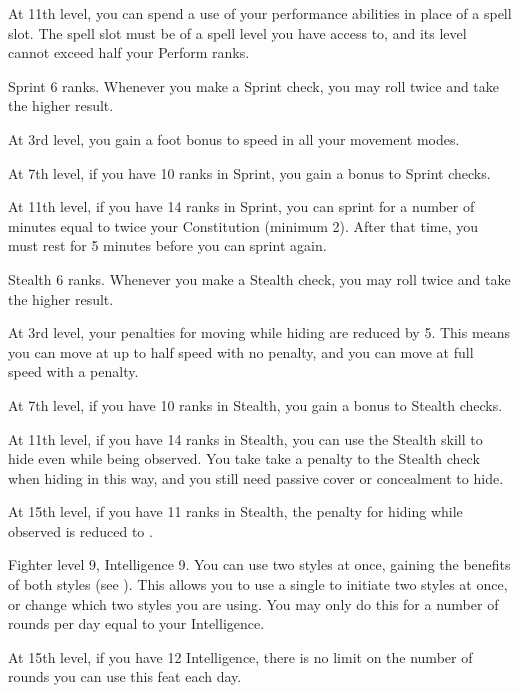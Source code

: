     At 11th level, you can spend a use of your performance abilities in place of a spell slot.
    The spell slot must be of a spell level you have access to, and its level cannot exceed half your Perform ranks.

    \featpre Sprint 6 ranks.
    \featben Whenever you make a Sprint check, you may roll twice and take the higher result.

    At 3rd level, you gain a  foot bonus to speed in all your movement modes.

    At 7th level, if you have 10 ranks in Sprint, you gain a  bonus to Sprint checks.

    At 11th level, if you have 14 ranks in Sprint, you can sprint for a number of minutes equal to twice your Constitution (minimum 2).
    After that time, you must rest for 5 minutes before you can sprint again.

    \featpre Stealth 6 ranks.
    \featben Whenever you make a Stealth check, you may roll twice and take the higher result.

    At 3rd level, your penalties for moving while hiding are reduced by 5.
    This means you can move at up to half speed with no penalty, and you can move at full speed with a  penalty.

    At 7th level, if you have 10 ranks in Stealth, you gain a  bonus to Stealth checks.

    At 11th level, if you have 14 ranks in Stealth, you can use the Stealth skill to hide even while being observed.
    You take take a  penalty to the Stealth check when hiding in this way, and you still need passive cover or concealment to hide.

    At 15th level, if you have 11 ranks in Stealth, the penalty for hiding while observed is reduced to .

    \featpre Fighter level 9, Intelligence 9.
    \featben You can use two styles at once, gaining the benefits of both styles (see ).
    This allows you to use a single  to initiate two styles at once, or change which two styles you are using.
    You may only do this for a number of rounds per day equal to your Intelligence.

    At 15th level, if you have 12 Intelligence, there is no limit on the number of rounds you can use this feat each day.

